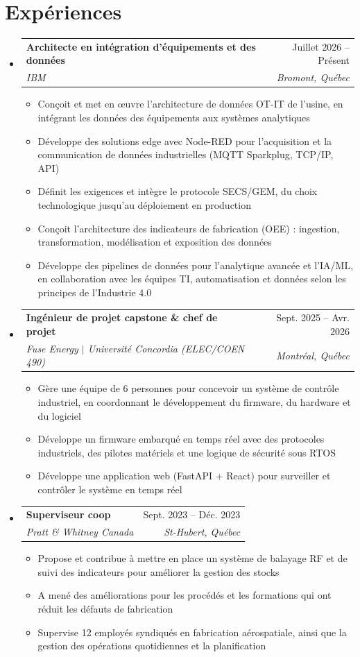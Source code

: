 \documentclass[letterpaper,12pt]{article}
\makeatletter
\newcommand{\resumeItem}[1]{
  \item\small{
    {#1 \vspace{0pt}}
  }
}
\newcommand{\resumeSubheading}[4]{
  \vspace{-2pt}\item
    \begin{tabular*}{0.97\textwidth}[t]{l@{\extracolsep{\fill}}r}
      \textbf{#1} & #2 \\
      \textit{\small#3} & \textit{\small #4} \\
    \end{tabular*}\vspace{-5pt}
}
\newcommand{\resumeSubHeadingListStart}{\begin{itemize}[leftmargin=0.15in, label={}]}
\newcommand{\resumeSubHeadingListEnd}{\end{itemize}}
\newcommand{\resumeItemListStart}{\begin{itemize}[leftmargin=0.2in, label={$\vcenter{\hbox{\scriptsize$\bullet$}}$}, itemsep=2pt, topsep=2pt, parsep=0pt]}
\newcommand{\resumeItemListEnd}{\end{itemize}\vspace{-2pt}}
\makeatother
\begin{document}
\section{Exp\'{e}riences}
  \resumeSubHeadingListStart
    \resumeSubheading
      {Architecte en int\'{e}gration d'\'{e}quipements et des donn\'{e}es}{Juillet 2026 -- Pr\'{e}sent}
      {IBM}{Bromont, Qu\'{e}bec}
      \resumeItemListStart
        \resumeItem{Con\c{c}oit et met en \oe{}uvre l'architecture de donn\'{e}es OT-IT de l'usine, en int\'{e}grant les donn\'{e}es des \'{e}quipements aux syst\`{e}mes analytiques}
        \resumeItem{D\'{e}veloppe des solutions edge avec Node-RED pour l'acquisition et la communication de donn\'{e}es industrielles (MQTT Sparkplug, TCP/IP, API)}
        \resumeItem{D\'{e}finit les exigences et int\`{e}gre le protocole SECS/GEM, du choix technologique jusqu'au d\'{e}ploiement en production}
        \resumeItem{Con\c{c}oit l'architecture des indicateurs de fabrication (OEE) : ingestion, transformation, mod\'{e}lisation et exposition des donn\'{e}es}
        \resumeItem{D\'{e}veloppe des pipelines de donn\'{e}es pour l'analytique avanc\'{e}e et l'IA/ML, en collaboration avec les \'{e}quipes TI, automatisation et donn\'{e}es selon les principes de l'Industrie 4.0}
      \resumeItemListEnd
    \resumeSubheading
      {Ing\'{e}nieur de projet capstone \& chef de projet}{Sept. 2025 -- Avr. 2026}
      {Fuse Energy $|$ Universit\'{e} Concordia (ELEC/COEN 490)}{Montr\'{e}al, Qu\'{e}bec}
      \resumeItemListStart
        \resumeItem{G\`{e}re une \'{e}quipe de 6 personnes pour concevoir un syst\`{e}me de contr\^{o}le industriel, en coordonnant le d\'{e}veloppement du firmware, du hardware et du logiciel}
        \resumeItem{D\'{e}veloppe un firmware embarqu\'{e} en temps r\'{e}el avec des protocoles industriels, des pilotes mat\'{e}riels et une logique de s\'{e}curit\'{e} sous RTOS}
        \resumeItem{D\'{e}veloppe une application web (FastAPI + React) pour surveiller et contr\^{o}ler le syst\`{e}me en temps r\'{e}el}
      \resumeItemListEnd
    \resumeSubheading
      {Superviseur coop}{Sept. 2023 -- D\'{e}c. 2023}
      {Pratt \& Whitney Canada}{St-Hubert, Qu\'{e}bec}
      \resumeItemListStart
        \resumeItem{Propose et contribue \`{a} mettre en place un syst\`{e}me de balayage RF et de suivi des indicateurs pour am\'{e}liorer la gestion des stocks}
        \resumeItem{A men\'{e} des am\'{e}liorations pour les proc\'{e}d\'{e}s et les formations qui ont r\'{e}duit les d\'{e}fauts de fabrication}
        \resumeItem{Supervise 12 employ\'{e}s syndiqu\'{e}s en fabrication a\'{e}rospatiale, ainsi que la gestion des op\'{e}rations quotidiennes et la planification}
      \resumeItemListEnd
  \resumeSubHeadingListEnd
\end{document}
